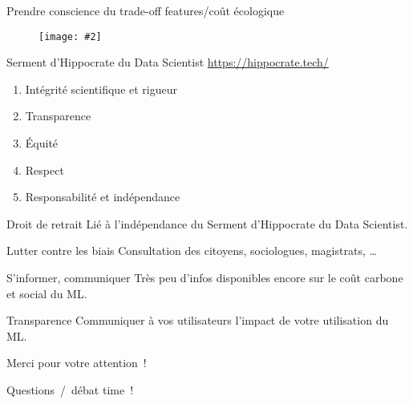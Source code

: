\documentclass[10pt]{beamer}
\newcommand{\imgth}[2][1]{%
  \begin{figure}%
    \centering%
    \texttt{[image: \#2]}%
  \end{figure}%
}
\begin{document}
\begin{frame}{Prendre conscience du trade-off features/coût
    écologique}

  \imgth[.9]{do-or-not}
\end{frame}

\begin{frame}{Serment d'Hippocrate du Data Scientist}
   \url{https://hippocrate.tech/}

   \pause

   \begin{enumerate}[<+->]
   \item Intégrité scientifique et rigueur
   \item Transparence
   \item Équité
   \item Respect
   \item Responsabilité et indépendance
   \end{enumerate}
\end{frame}

\begin{frame}{Droit de retrait}
  Lié à l'indépendance du Serment d'Hippocrate du Data Scientist.
\end{frame}

\begin{frame}{Lutter contre les biais}
  Consultation des citoyens, sociologues, magistrats, …
\end{frame}

\begin{frame}{S'informer, communiquer}
  Très peu d'infos disponibles encore sur le coût carbone et social du
  ML.
\end{frame}

\begin{frame}{Transparence}
  Communiquer à vos utilisateurs l'impact de votre utilisation du ML.
\end{frame}

\begin{frame}[standout]
  Merci pour votre attention !
\end{frame}

\begin{frame}[standout]
  Questions / débat time !
\end{frame}
\end{document}
